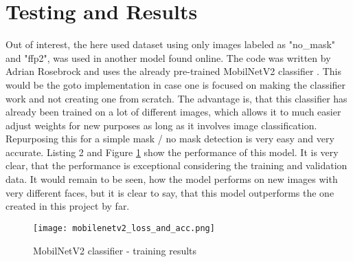 \section{Testing and Results}




Out of interest, the here used dataset using only images labeled as "no\_mask"
and "ffp2", was used in another model found online. The code was written by
Adrian Rosebrock and uses the already pre-trained MobilNetV2 classifier
\cite{Rosebrock2020}. This would be the goto implementation in case one is focused
on making the classifier work and not creating one from scratch. The advantage
is, that this classifier has already been trained on a lot of different images,
which allows it to much easier adjust weights for new purposes as long as it
involves image classification. Repurposing this for a simple mask / no mask
detection is very easy and very accurate. Listing 2 and Figure
\ref{fig:mobilenetv2} show the performance of this model. It is very clear, that
the performance is exceptional considering the training and validation data. It
would remain to be seen, how the model performs on new images with very
different faces, but it is clear to say, that this model outperforms the one
created in this project by far.



\begin{figure}
    \centering
    \texttt{[image: mobilenetv2\_loss\_and\_acc.png]}
    \caption{MobilNetV2 classifier - training results}
    \label{fig:mobilenetv2}
\end{figure}
